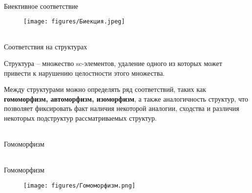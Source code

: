 \begin{frame}{\\Биективное соответствие}
    \topline
    \begin{center}
        \begin{figure}[Hb]
            \centering
            \texttt{[image: figures/Биекция.jpeg]}
        \end{figure}
    \end{center}
\end{frame}

\begin{frame}{\\Соответствия на структурах}
\topline
\fontsize{10}{12}\selectfont
\begin{SCn}
Структура – множество sc-элементов, удаление одного из которых может привести к нарушению целостности этого множества.

Между структурами можно определять ряд соответствий, таких как \textbf{гомоморфизм, автоморфизм, изоморфизм}, а также аналогичность структур, что позволяет фиксировать факт наличия некоторой аналогии,
сходства и различия некоторых подструктур рассматриваемых структур.
\end{SCn}
\end{frame}

\begin{frame}{\\Гомоморфизм}
\topline
\fontsize{10}{12}\selectfont
\begin{SCn}

\end{SCn}
\end{frame}

\begin{frame}{\\Гомоморфизм}
    \topline
    \begin{center}
        \begin{figure}[b]
            \centering
            \texttt{[image: figures/Гомоморфизм.png]}
        \end{figure}
    \end{center}
\end{frame}

